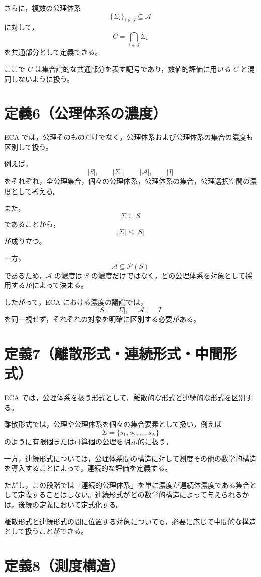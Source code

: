 \documentclass[a4paper,12pt]{article}
\begin{document}
さらに，複数の公理体系
\[
\{\Sigma_i\}_{i\in J}\subseteq\mathscr{A}
\]
に対して，
\[
C=\bigcap_{i\in J}\Sigma_i
\]
を共通部分として定義できる。

ここで $C$ は集合論的な共通部分を表す記号であり，数値的評価に用いる $C$ と混同しないように扱う。

\section{定義6（公理体系の濃度）}

ECA では，公理そのものだけでなく，公理体系および公理体系の集合の濃度も区別して扱う。

例えば，
\[
|S|,\qquad
|\Sigma|,\qquad
|\mathscr{A}|,\qquad
|I|
\]
をそれぞれ，全公理集合，個々の公理体系，公理体系の集合，公理選択空間の濃度として考える。

また，
\[
\Sigma\subseteq S
\]
であることから，
\[
|\Sigma|\leq |S|
\]
が成り立つ。

一方，
\[
\mathscr{A}\subseteq\mathcal{P}(S)
\]
であるため，$\mathscr{A}$ の濃度は $S$ の濃度だけではなく，どの公理体系を対象として採用するかによって決まる。

したがって，ECA における濃度の議論では，
\[
|S|,\quad |\Sigma|,\quad |\mathscr{A}|,\quad |I|
\]
を同一視せず，それぞれの対象を明確に区別する必要がある。

\section{定義7（離散形式・連続形式・中間形式）}

ECA では，公理体系を扱う形式として，離散的な形式と連続的な形式を区別する。

離散形式では，公理や公理体系を個々の集合要素として扱い，例えば
\[
\Sigma=\{s_1,s_2,\ldots,s_N\}
\]
のように有限個または可算個の公理を明示的に扱う。

一方，連続形式については，公理体系間の構造に対して測度その他の数学的構造を導入することによって，連続的な評価を定義する。

ただし，この段階では「連続的公理体系」を単に濃度が連続体濃度である集合として定義することはしない。連続形式がどの数学的構造によって与えられるかは，後続の定義において定式化する。

離散形式と連続形式の間に位置する対象についても，必要に応じて中間的な構造として扱うことができる。

\section{定義8（測度構造）}
\end{document}

